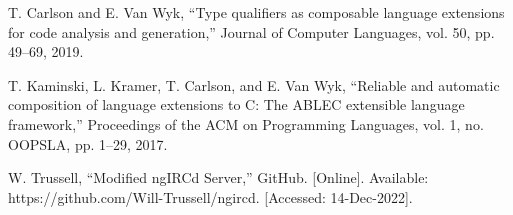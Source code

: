 \documentclass[12pt]{article}
\begin{document}
\begin{thebibliography}{99}
		T. Carlson and E. Van Wyk, “Type qualifiers as composable language 
		extensions for code analysis and generation,” Journal of Computer 
		Languages, vol. 50, pp. 49–69, 2019. 
	
	    T. Kaminski, L. Kramer, T. Carlson, and E. Van Wyk, “Reliable and 
        automatic composition of language extensions to C: The ABLEC extensible 
        language framework,” Proceedings of the ACM on Programming Languages, 
        vol. 1, no. OOPSLA, pp. 1–29, 2017. 
        
        		W. Trussell, “Modified ngIRCd Server,” GitHub. [Online]. Available: https://github.com/Will-Trussell/ngircd. 
		[Accessed: 14-Dec-2022]. 
\end{thebibliography}
\end{document}
